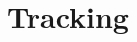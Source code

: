 \chapter{Tracking}
\label{cap:tracking}
\thispagestyle{empty}

\begin{quotation}
{\footnotesize
\noindent\emph{}
\begin{flushright}
\end{flushright}
}
\end{quotation}
\vspace{0.5cm}
